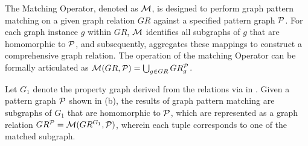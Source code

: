 

\begin{definition}
    \label{def:matching}
    The Matching Operator, denoted as \(\mathcal{M}\), is designed to perform graph pattern matching on a given graph relation \(GR\) against a specified pattern graph \(\mathcal{P}\). For each graph instance \(g\) within \(GR\), \(\mathcal{M}\) identifies all subgraphs of \(g\) that are homomorphic to \(\mathcal{P}\), and subsequently, aggregates these mappings to construct a comprehensive graph relation. The operation of the matching Operator can be formally articulated as \(\mathcal{M}(GR, \mathcal{P}) = \bigcup_{g \in GR} GR_g^{\mathcal{P}}\).%
\end{definition}

\begin{example}
    \label{ex:matching}
    Let \(G_1\) denote the property graph derived from the relations via \rgmapping in .
    Given a pattern graph \(\mathcal{P}\) shown in (b), the results of graph pattern matching are subgraphs of \(G_1\) that are homomorphic to \(\mathcal{P}\), which are represented as a graph relation \(GR^{\mathcal{P}} = \mathcal{M}(GR^{G_1}, \mathcal{P})\), wherein each tuple corresponds to one of the matched subgraph.
\end{example}


